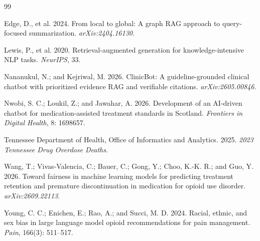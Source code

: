 \documentclass[letterpaper]{article}
\begin{document}
\small

\begin{thebibliography}{99}

 Edge, D., et al. 2024. From local to global: A graph RAG approach to query-focused summarization. \emph{arXiv:2404.16130}.

 Lewis, P., et al. 2020. Retrieval-augmented generation for knowledge-intensive NLP tasks. \emph{NeurIPS}, 33.

 Nananukul, N.; and Kejriwal, M. 2026. ClinicBot: A guideline-grounded clinical chatbot with prioritized evidence RAG and verifiable citations. \emph{arXiv:2605.00846}.

 Nwobi, S. C.; Loukil, Z.; and Jawahar, A. 2026. Development of an AI-driven chatbot for medication-assisted treatment standards in Scotland. \emph{Frontiers in Digital Health}, 8: 1698657.

 Tennessee Department of Health, Office of Informatics and Analytics. 2025. \emph{2023 Tennessee Drug Overdose Deaths}.

 Wang, T.; Vivas-Valencia, C.; Bauer, C.; Gong, Y.; Choo, K.-K. R.; and Guo, Y. 2026. Toward fairness in machine learning models for predicting treatment retention and premature discontinuation in medication for opioid use disorder. \emph{arXiv:2609.22113}.

 Young, C. C.; Enichen, E.; Rao, A.; and Succi, M. D. 2024. Racial, ethnic, and sex bias in large language model opioid recommendations for pain management. \emph{Pain}, 166(3): 511--517.

\end{thebibliography}
\end{document}
